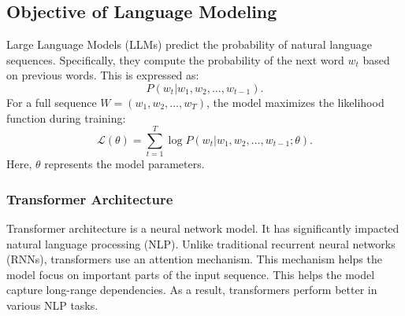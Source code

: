 \documentclass[fleqn,10pt]{SelfArx} %
\begin{document}








\subsection{Objective of Language Modeling}

Large Language Models (LLMs) predict the probability of natural language sequences. Specifically, they compute the probability of the next word $w_t$ based on previous words. This is expressed as:
\[
P(w_t | w_1, w_2, \ldots, w_{t-1}).
\]
For a full sequence $W = (w_1, w_2, \ldots, w_T)$, the model maximizes the likelihood function during training:
\[
\mathcal{L}(\theta) = \sum_{t=1}^T \log P(w_t | w_1, w_2, \ldots, w_{t-1}; \theta).
\]
Here, $\theta$ represents the model parameters.

\subsubsection{Transformer Architecture}

Transformer architecture is a neural network model. It has significantly impacted natural language processing (NLP). Unlike traditional recurrent neural networks (RNNs), transformers use an attention mechanism. This mechanism helps the model focus on important parts of the input sequence. This helps the model capture long-range dependencies. As a result, transformers perform better in various NLP tasks. 
\end{document}
